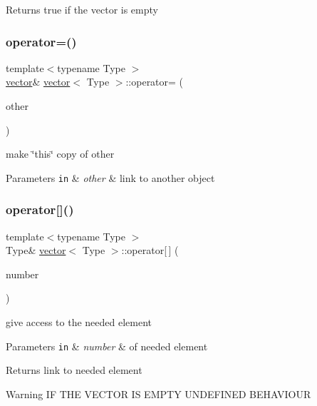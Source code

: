 \begin{DoxyReturn}{Returns}
true if the vector is empty 
\end{DoxyReturn}
\mbox{\label{classvector_af24b0bef0a5a0b8a3d4a65f0ce959b5f}} 
\subsubsection{\texorpdfstring{operator=()}{operator=()}}
{\footnotesize\ttfamily template$<$typename Type $>$ \\
\hyperlink{classvector}{vector}\& \hyperlink{classvector}{vector}$<$ Type $>$\+::operator= (\begin{DoxyParamCaption}\item[{const \hyperlink{classvector}{vector}$<$ Type $>$ \&}]{other }\end{DoxyParamCaption})}

make \char`\"{}this\char`\"{} copy of other 
\begin{DoxyParams}[1]{Parameters}
\mbox{\tt in}  & {\em other} & link to another object \\
\hline
\end{DoxyParams}
\mbox{\label{classvector_ad6b76f293f8827dd0b90bd982b04fd60}} 
\subsubsection{\texorpdfstring{operator[]()}{operator[]()}}
{\footnotesize\ttfamily template$<$typename Type $>$ \\
Type\& \hyperlink{classvector}{vector}$<$ Type $>$\+::operator\mbox{[}$\,$\mbox{]} (\begin{DoxyParamCaption}\item[{size\+\_\+t}]{number }\end{DoxyParamCaption})}

give access to the needed element 
\begin{DoxyParams}[1]{Parameters}
\mbox{\tt in}  & {\em number} & of needed element \\
\hline
\end{DoxyParams}
\begin{DoxyReturn}{Returns}
link to needed element 
\end{DoxyReturn}
\begin{DoxyWarning}{Warning}
IF T\+HE V\+E\+C\+T\+OR IS E\+M\+P\+TY U\+N\+D\+E\+F\+I\+N\+ED B\+E\+H\+A\+V\+I\+O\+UR 
\end{DoxyWarning}
\mbox{\label{classvector_a33e617a81ec2561bd840b8090e38a083}} 
